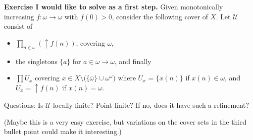 \documentclass[12pt, a4paper]{amsart}
\begin{document}
{\bf Exercise I would like to solve as a first step.} 
Given monotonically increasing $f:\omega\to\omega$ with $f(0)>0$, 
consider the following cover of $X$. Let ${\mathcal U}$ consist of
\begin{itemize}
    \item $\prod_{n\in\omega}(\uparrow f(n))$, covering $\bar{\omega}$, 
    \item the singletons $\{a\}$ for $a\in \omega\to\omega$, and finally 
    \item $\prod U_x$ covering $x\in X\setminus \big(\{\bar{\omega}\} 
    \cup \omega^\omega\big)$
    where $U_x$ = $\{x(n)\}$ if $x(n)\in\omega$, and $U_x = \uparrow f(n)$ 
    if $x(n) = \omega$. 
\end{itemize}
Questions: Is ${\mathcal U}$ locally finite? Point-finite? If no, does it have 
such a refinement?

(Maybe this is a very easy exercise, but variations on the cover sets in 
the third bullet point could make it interesting.)
\end{document}
